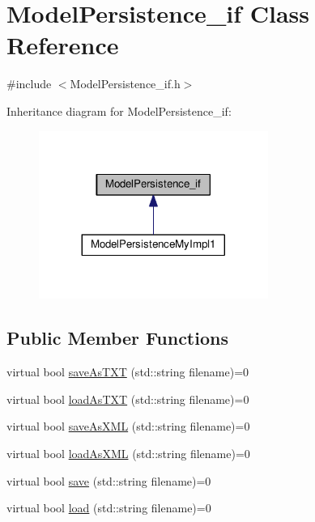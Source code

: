 \hypertarget{class_model_persistence__if}{\section{Model\-Persistence\-\_\-if Class Reference}
\label{class_model_persistence__if}
}


{\ttfamily \#include $<$Model\-Persistence\-\_\-if.\-h$>$}



Inheritance diagram for Model\-Persistence\-\_\-if\-:\nopagebreak
\begin{figure}[H]
\begin{center}
\leavevmode
\includegraphics[width=212pt]{class_model_persistence__if__inherit__graph}
\end{center}
\end{figure}
\subsection*{Public Member Functions}
\begin{DoxyCompactItemize}
\item 
virtual bool \hyperlink{class_model_persistence__if_a4cabe06b4f610b9237c52208ee6c51bd}{save\-As\-T\-X\-T} (std\-::string filename)=0
\item 
virtual bool \hyperlink{class_model_persistence__if_af1ee016d7810fc3798b5bf013398de7f}{load\-As\-T\-X\-T} (std\-::string filename)=0
\item 
virtual bool \hyperlink{class_model_persistence__if_afb8e1011e873757febfb0d055d592d38}{save\-As\-X\-M\-L} (std\-::string filename)=0
\item 
virtual bool \hyperlink{class_model_persistence__if_a8c44f9b2e917b33812cbaa7c844854c8}{load\-As\-X\-M\-L} (std\-::string filename)=0
\item 
virtual bool \hyperlink{class_model_persistence__if_a960acf977c56ed52a153524c6ed8d4c6}{save} (std\-::string filename)=0
\item 
virtual bool \hyperlink{class_model_persistence__if_a48f90bbb37e106ee4b423075660d5a73}{load} (std\-::string filename)=0
\end{DoxyCompactItemize}


